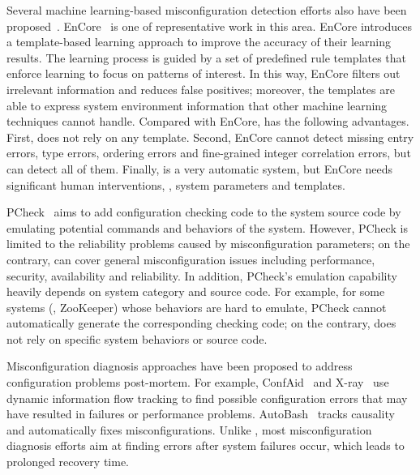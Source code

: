 Several machine learning-based misconfiguration detection efforts 
also have been proposed~\cite{yuan11context, zhang14encore}.
EnCore~\cite{zhang14encore} is one of representative work in this area.
EnCore introduces a template-based
learning approach to improve the accuracy of their learning results.
The learning process is guided by a set of predefined rule templates
that enforce learning to focus on patterns of interest.
In this way, EnCore filters out irrelevant information and reduces
false positives; moreover, the templates are able to express
system environment information that other machine learning
techniques cannot handle.
Compared with EnCore, \app has the following advantages.
First, \app does not rely on any template. 
Second, EnCore cannot detect missing entry errors, type errors,
ordering errors and fine-grained integer correlation errors,
but \app can detect all of them.
Finally, \app is a very automatic system, but
EnCore needs significant human interventions, \eg, system parameters
and templates.

PCheck~\cite{xu16early} aims to add configuration checking code to
the system source code by emulating potential commands and behaviors
of the system. However, PCheck is limited to the reliability problems
caused by misconfiguration parameters; on the contrary, 
\app can cover general misconfiguration issues 
including performance, security, availability and reliability.
In addition, PCheck's emulation capability heavily depends on 
system category and source code.
For example, for some systems (\eg, ZooKeeper) whose behaviors are 
hard to emulate, PCheck cannot automatically generate the corresponding
checking code; on the contrary, \app does not rely on specific
system behaviors or source code.

Misconfiguration diagnosis approaches have been proposed to address configuration problems post-mortem.
For example, ConfAid~\cite{attariyan10automating} 
and X-ray~\cite{attariyan12x-ray} use dynamic information
flow tracking to find possible configuration errors that may have resulted in
failures or performance problems. AutoBash~\cite{su07autobash} 
tracks causality and automatically fixes 
misconfigurations. Unlike \app, most misconfiguration
diagnosis efforts aim at finding errors after system
failures occur, which leads to prolonged recovery time.

